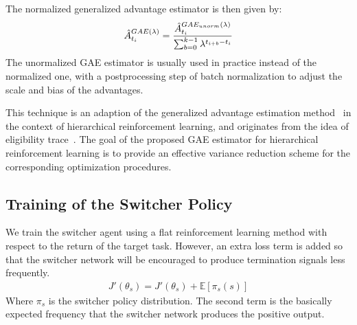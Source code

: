 The normalized generalized advantage estimator is then given by:
\begin{align}
\hat{A}_{t_i}^{GAE(\lambda)}
= \frac{\hat{A}_{t_i}^{GAE_{unorm}(\lambda)}}{\sum_{b=0}^{k-1} \lambda^{t_{i+b}-t_i}}
\end{align}
The unormalized GAE estimator is usually used in practice instead of the normalized one, with a postprocessing step of batch normalization to adjust the scale and bias of the advantages.

This technique is an adaption of the generalized advantage estimation method~\cite{schulman2015high} in the context of hierarchical reinforcement learning, and originates from the idea of eligibility trace~\cite{rlintro_sutton1998reinforcement}. The goal of the proposed GAE estimator for hierarchical reinforcement learning is to provide an effective variance reduction scheme for the corresponding optimization procedures.

\subsection{Training of the Switcher Policy}
We train the switcher agent using a flat reinforcement learning method with respect to the return of the target task. However, an extra loss term is added so that the switcher network will be encouraged to produce termination signals less frequently.
\begin{align}
J'(\theta_s) = J'(\theta_s) + \mathbb{E}[\pi_s(s)]
\end{align}
Where $\pi_s$ is the switcher policy distribution. The second term is the basically expected frequency that the switcher network produces the positive output.

